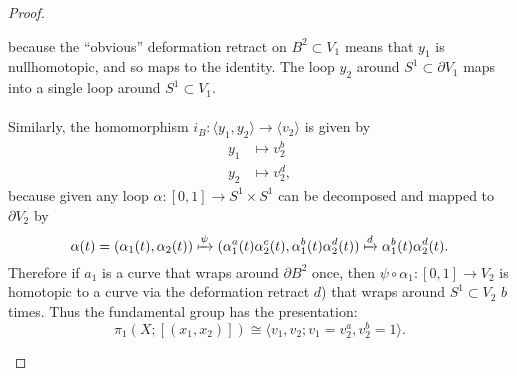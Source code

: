 \documentclass{article}
\begin{document}
\begin{proof}
\begin{enumerate}[a.]
      because the ``obvious'' deformation retract on $B^2 \subset V_1$ means
      that $y_1$ is nullhomotopic, and so maps to the identity. The loop $y_2$
      around $S^1 \subset \partial V_1$ maps into a single loop around
      $S^1 \subset V_1$.
      \\~\\
      Similarly, the homomorphism
      $i_B\colon \langle y_1, y_2 \rangle \rightarrow \langle v_2 \rangle$ is given by
      \begin{align*}
        y_1 &\mapsto v_2^b \\
        y_2 &\mapsto v_2^d,
      \end{align*} because given any loop
      $\alpha\colon [0,1] \rightarrow S^1 \times S^1$ can be decomposed and
      mapped to $\partial V_2$ by \[
        \alpha(t) = (\alpha_1(t), \alpha_2(t))
        \xmapsto{\psi} (\alpha_1^a(t)\alpha_2^c(t), \alpha_1^b(t)\alpha_2^d(t))
        \xmapsto{d} \alpha_1^b(t)\alpha_2^d(t).
      \]
      Therefore if $a_1$ is a curve that wraps around $\partial B^2$ once, then
      $\psi \circ \alpha_1\colon [0, 1] \rightarrow V_2$ is homotopic to a curve
      via the deformation retract $d$) that wraps around $S^1 \subset V_2$
      $b$ times.
      Thus the fundamental group has the presentation:
      \[
        \pi_1(X; [(x_1, x_2)])
        \cong \langle v_1, v_2; v_1 = v_2^a, v_2^b = 1 \rangle.
      \]
  \end{enumerate}
\end{proof}
\end{document}
